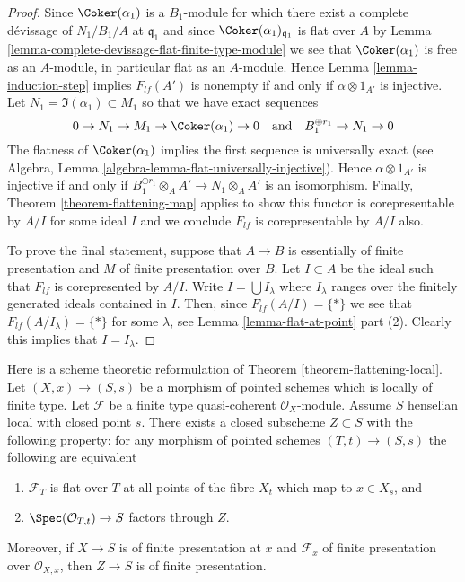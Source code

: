 \begin{proof}
\medskip\noindent
Since $\Coker(\alpha_1)$ is a $B_1$-module for which
there exist a complete d\'evissage of $N_1/B_1/A$ at $\mathfrak q_1$
and since $\Coker(\alpha_1)_{\mathfrak q_1}$ is
flat over $A$ by
Lemma \ref{lemma-complete-devissage-flat-finite-type-module}
we see that $\Coker(\alpha_1)$ is free as an $A$-module, in particular
flat as an $A$-module. Hence
Lemma \ref{lemma-induction-step}
implies $F_{lf}(A')$ is nonempty if and only if $\alpha \otimes 1_{A'}$
is injective. Let $N_1 = \Im(\alpha_1) \subset M_1$ so that
we have exact sequences
$$
0 \to N_1 \to M_1 \to \Coker(\alpha_1) \to 0
\quad\text{and}\quad
B_1^{\oplus r_1} \to N_1 \to 0
$$
The flatness of $\Coker(\alpha_1)$ implies the first sequence
is universally exact (see
Algebra, Lemma \ref{algebra-lemma-flat-universally-injective}).
Hence $\alpha \otimes 1_{A'}$ is injective if and only if
$B_1^{\oplus r_1} \otimes_A A' \to N_1 \otimes_A A'$
is an isomorphism. Finally,
Theorem \ref{theorem-flattening-map}
applies to show this functor is corepresentable by $A/I$ for some ideal $I$
and we conclude $F_{lf}$ is corepresentable by $A/I$ also.

\medskip\noindent
To prove the final statement, suppose that $A \to B$ is essentially of finite
presentation and $M$ of finite presentation over $B$. Let $I \subset A$
be the ideal such that $F_{lf}$ is corepresented by $A/I$.
Write $I = \bigcup I_\lambda$ where $I_\lambda$ ranges over the finitely
generated ideals contained in $I$. Then, since $F_{lf}(A/I) = \{*\}$
we see that $F_{lf}(A/I_\lambda) = \{*\}$ for some $\lambda$, see
Lemma \ref{lemma-flat-at-point} part (2).
Clearly this implies that $I = I_\lambda$.
\end{proof}

\begin{remark}
\label{remark-flattening-local-scheme-theoretic}
Here is a scheme theoretic reformulation of
Theorem \ref{theorem-flattening-local}.
Let $(X, x) \to (S, s)$ be a morphism of pointed schemes
which is locally of finite type. Let $\mathcal{F}$ be a finite
type quasi-coherent $\mathcal{O}_X$-module.
Assume $S$ henselian local with closed point $s$.
There exists a closed subscheme $Z \subset S$ with the following property:
for any morphism of pointed schemes $(T, t) \to (S, s)$ the following
are equivalent
\begin{enumerate}
\item $\mathcal{F}_T$ is flat over $T$ at all points of the fibre
$X_t$ which map to $x \in X_s$, and
\item $\Spec(\mathcal{O}_{T, t}) \to S$ factors through $Z$.
\end{enumerate}
Moreover, if $X \to S$ is of finite presentation at $x$ and $\mathcal{F}_x$
of finite presentation over $\mathcal{O}_{X, x}$, then $Z \to S$
is of finite presentation.
\end{remark}

